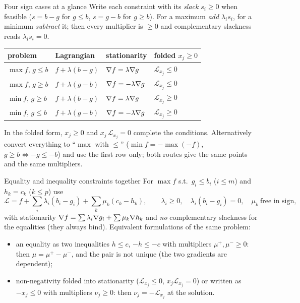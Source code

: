 \begin{rulebox}{Four sign cases at a glance}
Write each constraint with its \emph{slack} $s_i\ge0$ when feasible
($s=b-g$ for $g\le b$, $s=g-b$ for $g\ge b$). For a maximum \emph{add}
$\lambda_is_i$, for a minimum \emph{subtract} it; then every multiplier is
$\ge0$ and complementary slackness reads $\lambda_is_i=0$.
\begin{center}\footnotesize
\begin{tabular}{llll}
  \hline
  problem & Lagrangian & stationarity & folded $x_j\ge0$\\
  \hline
  $\max f$, $g\le b$ & $f+\lambda(b-g)$ & $\nabla f=\lambda\nabla g$ & $\mathcal{L}_{x_j}\le0$\\
  $\max f$, $g\ge b$ & $f+\lambda(g-b)$ & $\nabla f=-\lambda\nabla g$ & $\mathcal{L}_{x_j}\le0$\\
  $\min f$, $g\ge b$ & $f+\lambda(b-g)$ & $\nabla f=\lambda\nabla g$ & $\mathcal{L}_{x_j}\ge0$\\
  $\min f$, $g\le b$ & $f+\lambda(g-b)$ & $\nabla f=-\lambda\nabla g$ & $\mathcal{L}_{x_j}\ge0$\\
  \hline
\end{tabular}
\end{center}
In the folded form, $x_j\ge0$ and $x_j\,\mathcal{L}_{x_j}=0$ complete the
conditions. Alternatively convert everything to ``$\max$ with $\le$''
($\min f=-\max(-f)$, $g\ge b\iff-g\le-b$) and use the first row only; both
routes give the same points and the same multipliers.
\end{rulebox}

\begin{rulebox}{Equality and inequality constraints together}
For $\max f$ s.t.\ $g_i\le b_i$ ($i\le m$) and $h_k=c_k$ ($k\le p$) use
\[
  \mathcal{L}=f+\sum_i\lambda_i(b_i-g_i)+\sum_k\mu_k(c_k-h_k),
  \qquad \lambda_i\ge0,\quad \lambda_i(b_i-g_i)=0,\quad
  \mu_k\ \text{free in sign},
\]
with stationarity $\nabla f=\sum\lambda_i\nabla g_i+\sum\mu_k\nabla h_k$ and
\emph{no} complementary slackness for the equalities (they always bind).
Equivalent formulations of the same problem:
\begin{itemize}[leftmargin=1.6em,itemsep=0.3ex]
  \item an equality as two inequalities $h\le c$, $-h\le-c$ with
        multipliers $\mu^{+},\mu^{-}\ge0$: then $\mu=\mu^{+}-\mu^{-}$, and the
        pair is not unique (the two gradients are dependent);
  \item non-negativity folded into stationarity ($\mathcal{L}_{x_j}\le0$,
        $x_j\mathcal{L}_{x_j}=0$) or written as $-x_j\le0$ with multipliers
        $\nu_j\ge0$: then $\nu_j=-\mathcal{L}_{x_j}$ at the solution.
\end{itemize}
\end{rulebox}

